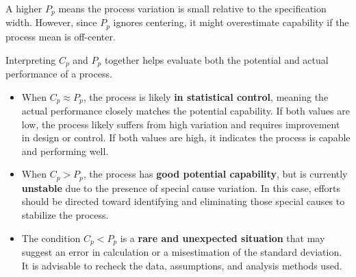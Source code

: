 \documentclass[twoside]{book}
\begin{document}
A higher $P_p$ means the process variation is small relative to the specification width. However, since $P_p$ ignores centering, it might overestimate capability if the process mean is off-center.

Interpreting \(C_p\) and \(P_p\) together helps evaluate both the potential and actual performance of a process.


\begin{itemize}
    \item When \(C_p \approx P_p\), the process is likely \textbf{in statistical control}, meaning the actual performance closely matches the potential capability. If both values are low, the process likely suffers from high variation and requires improvement in design or control. If both values are high, it indicates the process is capable and performing well.

    \item When \(C_p > P_p\), the process has \textbf{good potential capability}, but is currently \textbf{unstable} due to the presence of special cause variation. In this case, efforts should be directed toward identifying and eliminating those special causes to stabilize the process.

    \item The condition \(C_p < P_p\) is a \textbf{rare and unexpected situation} that may suggest an error in calculation or a misestimation of the standard deviation. It is advisable to recheck the data, assumptions, and analysis methods used.
\end{itemize}


%
%
\end{document}
